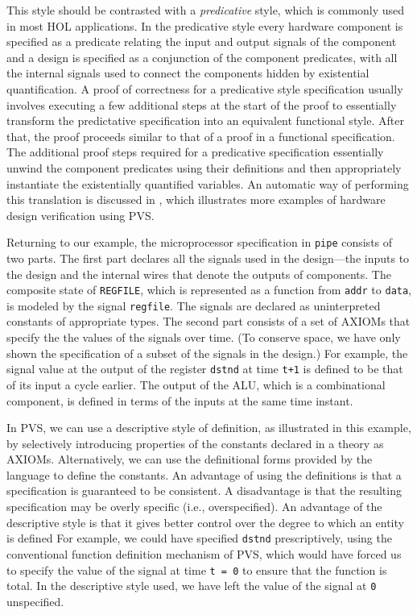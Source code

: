This style should be contrasted with
a {\em predicative} style, which is commonly used in most HOL applications.
In the predicative style every hardware component is specified as a
predicate relating the
input and output signals of the component and a design is
specified as a conjunction of the component predicates, with all
the internal signals used to connect the components
hidden by existential quantification.
A proof of correctness for a predicative style specification usually involves
executing a few additional steps at the start of the proof
to essentially transform
the predictative specification into an equivalent functional style.
After that, the proof proceeds similar to that of a proof in
a functional specification.
The additional proof steps required for a predicative specification
essentially unwind the component predicates using
their definitions and then appropriately
instantiate the existentially quantified variables.
An automatic way of performing this translation is discussed in
\cite{HW-Tutorial:Report}, which illustrates more examples
of hardware design verification using PVS.

Returning to our example, the microprocessor specification
in {\tt pipe} consists of two parts.
The first part declares all the signals
used in the design---the inputs
to the design and the internal wires that denote the outputs of components.
The composite state of {\tt REGFILE}, which is represented
as a function from {\tt addr} to {\tt data}, is modeled by the signal
{\tt regfile}.
The signals are declared as uninterpreted constants of appropriate types.
The second part consists of a set of AXIOMs that specify the
the values of the signals over time.
(To conserve space, we have only shown the specification of a subset
of the signals in the design.)
For example, the signal value at the output of the
register {\tt dstnd} at time {\tt t+1} is defined to be that of its
input a cycle earlier.
The output of the ALU, which is a combinational component, is defined
in terms of the inputs at the same time instant.

In PVS, we can use a descriptive style of definition, as illustrated
in this example, by selectively introducing properties of the
constants declared in a theory as AXIOMs.  Alternatively, we can use
the definitional forms provided by the language to define the
constants.  An advantage of using the definitions is that a
specification is guaranteed to be consistent. A disadvantage is that
the resulting specification may be overly specific (i.e.,
overspecified).  An advantage of the descriptive style is that it
gives better control over the degree to which an entity is defined For
example, we could have specified {\tt dstnd} prescriptively, using the
conventional function definition mechanism of PVS, which would have
forced us to specify the value of the signal at time {\tt t = 0} to
ensure that the function is total.  In the descriptive style used, we
have left the value of the signal at {\tt 0} unspecified.

